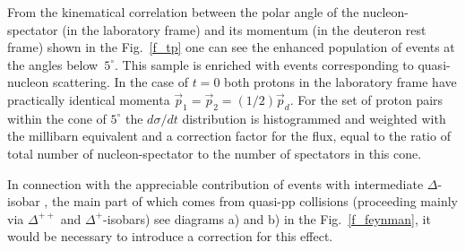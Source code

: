 \documentclass[a4paper,12pt]{article}
\begin{document}
From the kinematical correlation between the polar angle of the
nucleon-spectator (in the laboratory frame) and its momentum (in the deuteron
rest frame) shown in the Fig.~\ref{f_tp} one can see the enhanced population
of events at the angles below~$5 ^{\circ}$. This sample is enriched with events
corresponding to quasi-nucleon scattering. In the case of $t = 0 $ both  protons
in the laboratory frame have practically identical momenta
$ \vec {p} _1 = \vec {p} _2 = (1/2) \vec {p} _d $. For the set of proton pairs
within the cone of $ 5 ^{\circ} $ the $d \sigma/dt $ distribution is
histogrammed and weighted  with the millibarn equivalent and a correction factor
for the flux, equal to the ratio of total number of nucleon-spectator to the
number of spectators in this cone.

In connection with the appreciable contribution of events with intermediate
$ \Delta $-isobar \cite{a14, a4}, the main part of which comes from quasi-pp
collisions (proceeding mainly via $ \Delta ^{++} $ and $ \Delta ^{+} $-isobars)
see diagrams a) and b) in the Fig.~\ref{f_feynman}, it would be necessary to
introduce a correction for this effect.
\\ \\
\end{document}
